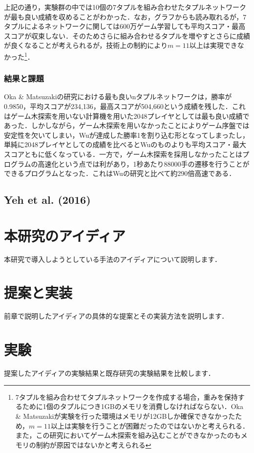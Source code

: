 \documentclass{suribt}
\begin{document}
上記の通り，実験群の中では10個の7タプルを組み合わせたタプルネットワークが最も良い成績を収めることがわかった．なお，グラフからも読み取れるが，7タプルによるネットワークに関しては600万ゲーム学習しても平均スコア・最高スコアが収束しない．そのためさらに組み合わせるタプルを増やすとさらに成績が良くなることが考えられるが，技術上の制約により$m=11$以上は実現できなかった\footnote{7タプルを組み合わせてタプルネットワークを作成する場合，重みを保持するために1個のタプルにつき1GBのメモリを消費しなければならない．Oka \& Matsuzakiが実験を行った環境はメモリが12GBしか確保できなかったため，$m=11$以上は実験を行うことが困難だったのではないかと考えられる．また，この研究においてゲーム木探索を組み込むことができなかったのもメモリの制約が原因ではないかと考えられる}．

\subsection{結果と課題}
Oka \& Matsuzakiの研究における最も良いnタプルネットワークは，勝率が0.9850，平均スコアが234,136，最高スコアが504,660という成績を残した．これはゲーム木探索を用いない計算機を用いた2048プレイヤとしては最も良い成績であった．しかしながら，ゲーム木探索を用いなかったことによりゲーム序盤では安定性を欠いてしまい，Wuが達成した勝率1を割り込む形となってしまったし，単純に2048プレイヤとしての成績を比べるとWuのものよりも平均スコア・最大スコアともに低くなっている．一方で，ゲーム木探索を採用しなかったことはプログラムの高速化という点では利があり，1秒あたり88000手の遷移を行うことができるプログラムとなった．これはWuの研究と比べて約290倍高速である．

\section{Yeh et al. (2016)}


\chapter{本研究のアイディア}
本研究で導入しようとしている手法のアイディアについて説明します．

\chapter{提案と実装}
前章で説明したアイディアの具体的な提案とその実装方法を説明します．

\chapter{実験}
提案したアイディアの実験結果と既存研究の実験結果を比較します．
\end{document}

